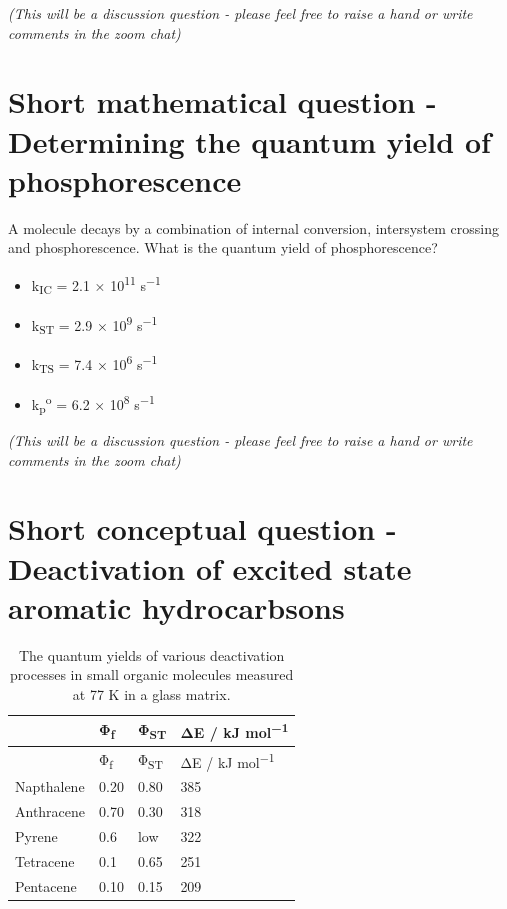 \documentclass[
]{book}
\providecommand{\tightlist}{%
  \setlength{\itemsep}{0pt}\setlength{\parskip}{0pt}}
\begin{document}
\emph{(This will be a discussion question - please feel free to raise a hand or write comments in the zoom chat)}

\hypertarget{sec:calcphos}{%
\section{Short mathematical question - Determining the quantum yield of phosphorescence}\label{sec:calcphos}}

A molecule decays by a combination of internal conversion, intersystem crossing and phosphorescence. What is the quantum yield of phosphorescence?

\begin{itemize}
\tightlist
\item
  k\textsubscript{IC} = 2.1 × 10\textsuperscript{11} s\textsuperscript{−1}
\item
  k\textsubscript{ST} = 2.9 × 10\textsuperscript{9} s\textsuperscript{−1}
\item
  k\textsubscript{TS} = 7.4 × 10\textsuperscript{6} s\textsuperscript{−1}
\item
  k\textsubscript{p}\textsuperscript{o} = 6.2 × 10\textsuperscript{8} s\textsuperscript{−1}
\end{itemize}

\emph{(This will be a discussion question - please feel free to raise a hand or write comments in the zoom chat)}

\hypertarget{sec:exhydrocarbons}{%
\section{Short conceptual question - Deactivation of excited state aromatic hydrocarbsons}\label{sec:exhydrocarbons}}

\begin{longtable}[]{@{}llll@{}}
\caption{\label{tab:smallmolQY} The quantum yields of various deactivation processes in small organic molecules measured at 77 K in a glass matrix.}\tabularnewline
\toprule
& Φ\textsubscript{f} & Φ\textsubscript{ST} & ΔE / kJ mol\textsuperscript{−1}\tabularnewline
\midrule
\endfirsthead
\toprule
& Φ\textsubscript{f} & Φ\textsubscript{ST} & ΔE / kJ mol\textsuperscript{−1}\tabularnewline
\midrule
\endhead
Napthalene & 0.20 & 0.80 & 385\tabularnewline
Anthracene & 0.70 & 0.30 & 318\tabularnewline
Pyrene & 0.6 & low & 322\tabularnewline
Tetracene & 0.1 & 0.65 & 251\tabularnewline
Pentacene & 0.10 & 0.15 & 209\tabularnewline
\bottomrule
\end{longtable}
\end{document}
